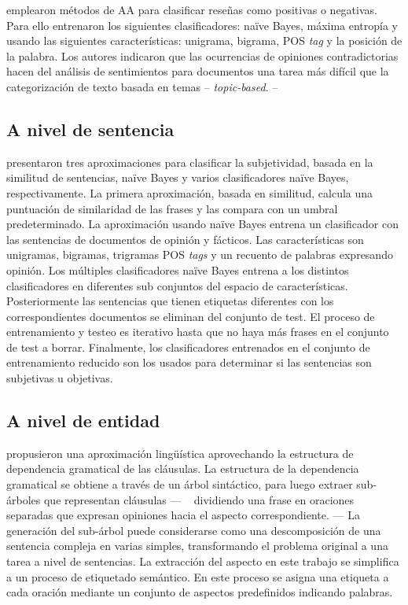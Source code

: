 \citeauthor{Pang2002} \cite{Pang2002} emplearon métodos de \ac{AA} para
clasificar reseñas como positivas o negativas. Para ello entrenaron los
siguientes clasificadores: naïve Bayes, máxima entropía y 
usando las siguientes características: unigrama, bigrama, \ac{POS} \emph{tag} y
la posición de la palabra. Los autores indicaron que las ocurrencias de
opiniones contradictorias hacen del análisis de sentimientos para documentos una
tarea más difícil que la categorización de texto basada en temas --
\emph{topic-based}. --

\subsection{A nivel de sentencia}
\label{subsec:soasentence}

\citeauthor{Yu2003} \cite{Yu2003} presentaron tres aproximaciones para
clasificar la subjetividad, basada en la similitud de sentencias, naïve Bayes y
varios clasificadores naïve Bayes, respectivamente. La primera aproximación,
basada en similitud, calcula una puntuación de similaridad de las frases y las
compara con un umbral predeterminado. La aproximación usando naïve Bayes entrena
un clasificador con las sentencias de documentos de opinión y fácticos. Las
características son unigramas, bigramas, trigramas \ac{POS} \emph{tags} y un
recuento de palabras expresando opinión. Los múltiples clasificadores naïve
Bayes entrena a los distintos clasificadores en diferentes sub conjuntos del
espacio de características. Posteriormente las sentencias que tienen etiquetas
diferentes con los correspondientes documentos se eliminan del conjunto de
test. El proceso de entrenamiento y testeo es iterativo hasta que no haya más
frases en el conjunto de test a borrar. Finalmente, los clasificadores
entrenados en el conjunto de entrenamiento reducido son los usados para
determinar si las sentencias son subjetivas u objetivas.

\subsection{A nivel de entidad}
\label{subsec:soaentity}

\citeauthor{Thet2010} \cite{Thet2010} propusieron una aproximación lingüística
aprovechando la estructura de dependencia gramatical de las cláusulas. La
estructura de la dependencia gramatical se obtiene a través de un árbol
sintáctico, para luego extraer sub-árboles que representan cláusulas --- \eg~
dividiendo una frase en oraciones separadas que expresan opiniones hacia el
aspecto correspondiente. --- La generación del sub-árbol puede considerarse como
una descomposición de una sentencia compleja en varias simples, transformando el
problema original a una tarea a nivel de sentencias. La extracción del aspecto
en este trabajo se simplifica a un proceso de etiquetado semántico. En este
proceso se asigna una etiqueta a cada oración mediante un conjunto de aspectos
predefinidos indicando palabras.

